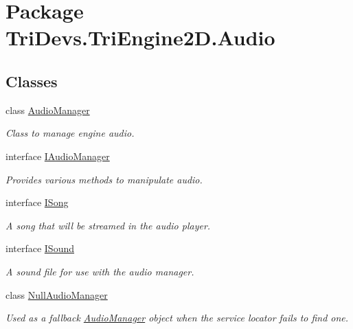 \hypertarget{namespace_tri_devs_1_1_tri_engine2_d_1_1_audio}{\section{Package Tri\-Devs.\-Tri\-Engine2\-D.\-Audio}
\label{namespace_tri_devs_1_1_tri_engine2_d_1_1_audio}
}
\subsection*{Classes}
\begin{DoxyCompactItemize}
\item 
class \hyperlink{class_tri_devs_1_1_tri_engine2_d_1_1_audio_1_1_audio_manager}{Audio\-Manager}
\begin{DoxyCompactList}\small\item\em Class to manage engine audio. \end{DoxyCompactList}\item 
interface \hyperlink{interface_tri_devs_1_1_tri_engine2_d_1_1_audio_1_1_i_audio_manager}{I\-Audio\-Manager}
\begin{DoxyCompactList}\small\item\em Provides various methods to manipulate audio. \end{DoxyCompactList}\item 
interface \hyperlink{interface_tri_devs_1_1_tri_engine2_d_1_1_audio_1_1_i_song}{I\-Song}
\begin{DoxyCompactList}\small\item\em A song that will be streamed in the audio player. \end{DoxyCompactList}\item 
interface \hyperlink{interface_tri_devs_1_1_tri_engine2_d_1_1_audio_1_1_i_sound}{I\-Sound}
\begin{DoxyCompactList}\small\item\em A sound file for use with the audio manager. \end{DoxyCompactList}\item 
class \hyperlink{class_tri_devs_1_1_tri_engine2_d_1_1_audio_1_1_null_audio_manager}{Null\-Audio\-Manager}
\begin{DoxyCompactList}\small\item\em Used as a fallback \hyperlink{class_tri_devs_1_1_tri_engine2_d_1_1_audio_1_1_audio_manager}{Audio\-Manager} object when the service locator fails to find one. \end{DoxyCompactList}\item 

\end{DoxyCompactItemize}
